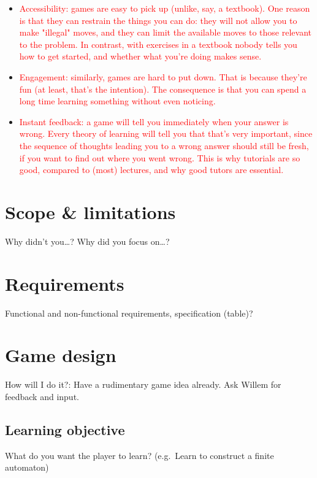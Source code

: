 \documentclass[a4paper,11pt]{article}
\newcommand{\draft}[1]{\textcolor{red}{#1}} %
\begin{document}
\begin{enumerate}
\begin{itemize}
\begin{itemize}
        \item \draft{Accessibility: games are easy to pick up (unlike, say, a textbook). One reason is that they can restrain the things you can do: they will not allow you to make "illegal" moves, and they can limit the available moves to those relevant to the problem. In contrast, with exercises in a textbook nobody tells you how to get started, and whether what you're doing makes sense.}
        \item \draft{Engagement: similarly, games are hard to put down. That is because they're fun (at least, that's the intention). The consequence is that you can spend a long time learning something without even noticing.}
        \item \draft{Instant feedback: a game will tell you immediately when your answer is wrong. Every theory of learning will tell you that that's very important, since the sequence of thoughts leading you to a wrong answer should still be fresh, if you want to find out where you went wrong. This is why tutorials are so good, compared to (most) lectures, and why good tutors are essential.}
      \end{itemize}
    \end{itemize}
\end{enumerate}

\section{Scope \& limitations} %
Why didn't you\dots? Why did you focus on\dots?

\section{Requirements} %
Functional and non-functional requirements, specification (table)?

\section{Game design} %
How will I do it?: Have a rudimentary game idea already. Ask Willem for feedback and input.

\subsection{Learning objective}
What do you want the player to learn? (e.g.\ Learn to construct a finite automaton)
\end{document}
